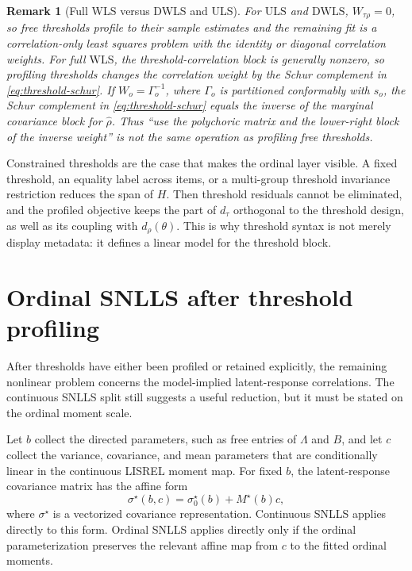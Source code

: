 \documentclass[11pt]{article}
\newtheorem{remark}{Remark}
\newcommand{\ULS}{\mathrm{ULS}}
\newcommand{\DWLS}{\mathrm{DWLS}}
\newcommand{\WLS}{\mathrm{WLS}}
\begin{document}
\begin{remark}[Full WLS versus DWLS and ULS]
For \(\ULS\) and \(\DWLS\), \(W_{\tau\rho}=0\), so free thresholds profile to
their sample estimates and the remaining fit is a correlation-only least
squares problem with the identity or diagonal correlation weights. For full
\(\WLS\), the threshold-correlation block is generally nonzero, so profiling
thresholds changes the correlation weight by the Schur complement in
\eqref{eq:threshold-schur}. If \(W_o=\Gamma_o^{-1}\), where
\(\Gamma_o\) is partitioned conformably with \(s_o\), the Schur complement in
\eqref{eq:threshold-schur} equals the inverse of the marginal covariance block
for \(\hat\rho\). Thus ``use the polychoric matrix and the lower-right block of
the inverse weight'' is not the same operation as profiling free thresholds.
\end{remark}

Constrained thresholds are the case that makes the ordinal layer visible. A
fixed threshold, an equality label across items, or a multi-group threshold
invariance restriction reduces the span of \(H\). Then threshold residuals
cannot be eliminated, and the profiled objective keeps the part of
\(d_\tau\) orthogonal to the threshold design, as well as its coupling with
\(d_\rho(\theta)\). This is why threshold syntax is not merely display
metadata: it defines a linear model for the threshold block.

\section{Ordinal SNLLS after threshold profiling}
\label{sec:ordinal-snlls}

After thresholds have either been profiled or retained explicitly, the
remaining nonlinear problem concerns the model-implied latent-response
correlations. The continuous SNLLS split still suggests a useful reduction,
but it must be stated on the ordinal moment scale.

Let \(b\) collect the directed parameters, such as free entries of
\(\Lambda\) and \(B\), and let \(c\) collect the variance, covariance, and mean
parameters that are conditionally linear in the continuous LISREL moment map.
For fixed \(b\), the latent-response covariance matrix has the affine form
\begin{equation}
  \sigma^\star(b,c)=\sigma^\star_0(b)+M^\star(b)c,
  \label{eq:latent-response-affine}
\end{equation}
where \(\sigma^\star\) is a vectorized covariance representation. Continuous
SNLLS applies directly to this form. Ordinal SNLLS applies directly only if
the ordinal parameterization preserves the relevant affine map from \(c\) to
the fitted ordinal moments.
\end{document}
